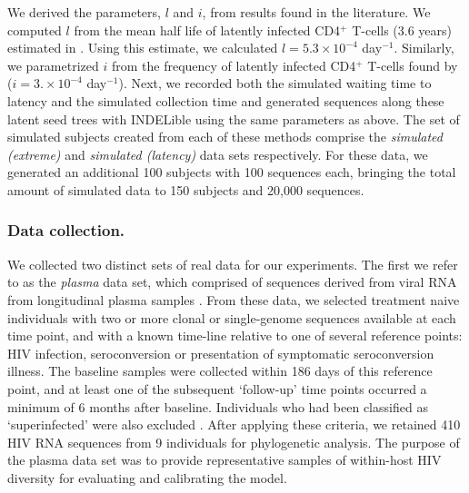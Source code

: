 \documentclass{bmcart}
\begin{document}
We derived the parameters, $l$ and $i$, from results found in the literature.
We computed $l$ from the mean half life of latently infected CD4$^+$ T-cells ($3.6$ years) estimated in \cite{Crooks15}.
Using this estimate, we calculated $l = 5.3 \times 10^{-4}$ day$^{-1}$.
Similarly, we parametrized $i$ from the frequency of latently infected CD4$^+$ T-cells found by \cite{Ho13} ($i = 3. \times 10^{-4}$ day$^{-1}$).
Next, we recorded both the simulated waiting time to latency and the simulated collection time and generated sequences along these latent seed trees with INDELible using the same parameters as above.
The set of simulated subjects created from each of these methods comprise the \emph{simulated (extreme)} and \emph{simulated (latency)} data sets respectively.
For these data, we generated an additional 100 subjects with 100 sequences each, bringing the total amount of simulated data to 150 subjects and 20,000 sequences.


\subsubsection * {Data collection.} \label{subsec:dcollection} %
We collected two distinct sets of real data for our experiments. 
The first we refer to as the {\em plasma} data set, which comprised of sequences derived from viral RNA from longitudinal plasma samples \cite{McCloskey14}. 
From these data, we selected treatment naive individuals with two or more clonal or single-genome sequences available at each time point, and with a known time-line relative to one of several reference points: HIV infection, seroconversion or presentation of symptomatic seroconversion illness. 
The baseline samples were collected within 186 days of this reference point, and at least one of the subsequent `follow-up' time points occurred a minimum of 6 months after baseline.
Individuals who had been classified as `superinfected' were also excluded \cite{McCloskey14}.
After applying these criteria, we retained 410 HIV RNA sequences from 9 individuals for phylogenetic analysis.
The purpose of the plasma data set was to provide representative samples of within-host HIV diversity for evaluating and calibrating the model.
\end{document}
